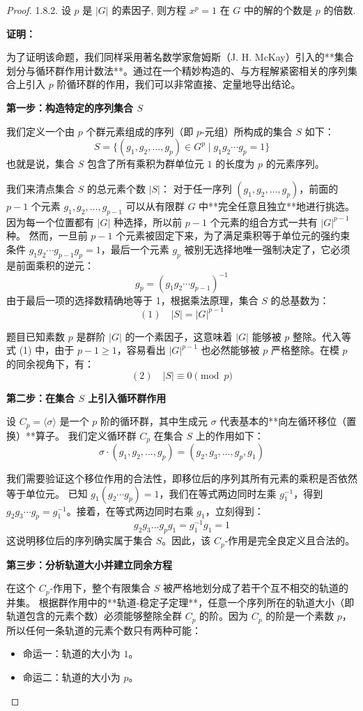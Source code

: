 \documentclass[]{article}
\begin{document}
\begin{proof}
1.8.2. 设 $p$ 是 $|G|$ 的素因子, 则方程 $x^{p} = 1$ 在 $G$ 中的解的个数是 $p$ 的倍数. 

\bigskip
\noindent \textbf{证明：} 

为了证明该命题，我们同样采用著名数学家詹姆斯（J. H. McKay）引入的**集合划分与循环群作用计数法**。通过在一个精妙构造的、与方程解紧密相关的序列集合上引入 $p$ 阶循环群的作用，我们可以非常直接、定量地导出结论。

\bigskip
\noindent \textbf{第一步：构造特定的序列集合 $S$}

我们定义一个由 $p$ 个群元素组成的序列（即 $p$-元组）所构成的集合 $S$ 如下：
\[ S = \{ (g_1, g_2, \dots, g_p) \in G^p \mid g_1 g_2 \cdots g_p = 1 \} \]
也就是说，集合 $S$ 包含了所有乘积为群单位元 $1$ 的长度为 $p$ 的元素序列。

我们来清点集合 $S$ 的总元素个数 $|S|$：
对于任一序列 $(g_1, g_2, \dots, g_p)$，前面的 $p-1$ 个元素 $g_1, g_2, \dots, g_{p-1}$ 可以从有限群 $G$ 中**完全任意且独立**地进行挑选。因为每一个位置都有 $|G|$ 种选择，所以前 $p-1$ 个元素的组合方式一共有 $|G|^{p-1}$ 种。
然而，一旦前 $p-1$ 个元素被固定下来，为了满足乘积等于单位元的强约束条件 $g_1 g_2 \cdots g_{p-1} g_p = 1$，最后一个元素 $g_p$ 被别无选择地唯一强制决定了，它必须是前面乘积的逆元：
\[ g_p = (g_1 g_2 \cdots g_{p-1})^{-1} \]
由于最后一项的选择数精确地等于 1，根据乘法原理，集合 $S$ 的总基数为：
\[ (1) \quad |S| = |G|^{p-1} \]

题目已知素数 $p$ 是群阶 $|G|$ 的一个素因子，这意味着 $|G|$ 能够被 $p$ 整除。代入等式 (1) 中，由于 $p-1 \ge 1$，容易看出 $|G|^{p-1}$ 也必然能够被 $p$ 严格整除。在模 $p$ 的同余视角下，有：
\[ (2) \quad |S| \equiv 0 \pmod p \]

\bigskip
\noindent \textbf{第二步：在集合 $S$ 上引入循环群作用}

设 $C_p = \langle \sigma \rangle$ 是一个 $p$ 阶的循环群，其中生成元 $\sigma$ 代表基本的**向左循环移位（置换）**算子。
我们定义循环群 $C_p$ 在集合 $S$ 上的作用如下：
\[ \sigma \cdot (g_1, g_2, \dots, g_p) = (g_2, g_3, \dots, g_p, g_1) \]

我们需要验证这个移位作用的合法性，即移位后的序列其所有元素的乘积是否依然等于单位元。
已知 $g_1 (g_2 \cdots g_p) = 1$，我们在等式两边同时左乘 $g_1^{-1}$，得到 $g_2 g_3 \cdots g_p = g_1^{-1}$。接着，在等式两边同时右乘 $g_1$，立刻得到：
\[ g_2 g_3 \dots g_p g_1 = g_1^{-1} g_1 = 1 \]
这说明移位后的序列确实属于集合 $S$。因此，该 $C_p$-作用是完全良定义且合法的。

\bigskip
\noindent \textbf{第三步：分析轨道大小并建立同余方程}

在这个 $C_p$-作用下，整个有限集合 $S$ 被严格地划分成了若干个互不相交的轨道的并集。
根据群作用中的**轨道-稳定子定理**，任意一个序列所在的轨道大小（即轨道包含的元素个数）必须能够整除全群 $C_p$ 的阶。因为 $C_p$ 的阶是一个素数 $p$，所以任何一条轨道的元素个数只有两种可能：
\begin{itemize}
	\item 命运一：轨道的大小为 $1$。
	\item 命运二：轨道的大小为 $p$。
\end{itemize}


\end{proof}
\end{document}
